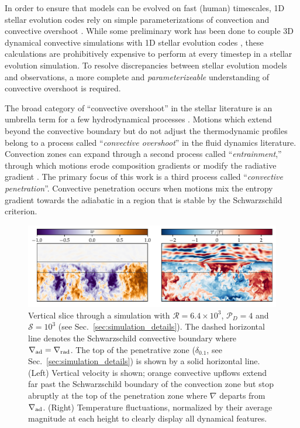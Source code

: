 \documentclass[twocolumn]{aastex631}
\newcommand{\gradrad}{\ensuremath{\nabla_{\rm{rad}}}}
\newcommand{\gradad}{\ensuremath{\nabla_{\rm{ad}}}}
\newcommand{\justgrad}{\ensuremath{\nabla}}
\newcommand{\mP}{\ensuremath{\mathcal{P}}}
\newcommand{\mR}{\ensuremath{\mathcal{R}}}
\newcommand{\mS}{\ensuremath{\mathcal{S}}}
\begin{document}
In order to ensure that models can be evolved on fast (human) timescales, 1D stellar evolution codes rely on simple parameterizations of convection \citep[e.g., mixing length theory,][]{bohm-vitense1958} and convective overshoot \citep{shaviv_salpeter_1973, maeder1975, herwig2000, paxton_etal_2011, paxton_etal_2013, paxton_etal_2018, paxton_etal_2019}.
While some preliminary work has been done to couple 3D dynamical convective simulations with 1D stellar evolution codes \citep{jorgensen_weiss_2019}, these calculations are prohibitively expensive to perform at every timestep in a stellar evolution simulation.
To resolve discrepancies between stellar evolution models and observations, a more complete and \emph{parameterizeable} understanding of convective overshoot is required.

The broad category of ``convective overshoot'' in the stellar literature is an umbrella term for a few hydrodynamical processes \citep{zahn1991, brummell_etal_2002, korre_etal_2019}.
Motions which extend beyond the convective boundary but do not adjust the thermodynamic profiles belong to a process called ``\emph{convective overshoot}'' in the fluid dynamics literature.
Convection zones can expand through a second process called ``\emph{entrainment},'' through which motions erode composition gradients or modify the radiative gradient \citep[][]{meakin_arnett_2007, viallet_etal_2013, cristini_etal_2017, fuentes_cumming_2020, horst_etal_2021}.
The primary focus of this work is a third process called ``\emph{convective penetration}''.
Convective penetration occurs when motions mix the entropy gradient towards the adiabatic in a region that is stable by the Schwarzschild criterion.

\begin{figure}[t]
\centering
\includegraphics[width=\textwidth]{vertical_dynamics_panels.pdf}
\caption{
Vertical slice through a simulation with $\mR = 6.4 \times 10^3$, $\mP_D = 4$ and $\mS = 10^3$ (see Sec.~\ref{sec:simulation_details}).
The dashed horizontal line denotes the Schwarzschild convective boundary where $\gradad = \gradrad$.
The top of the penetrative zone ($\delta_{0.1}$, see Sec.~\ref{sec:simulation_details}) is shown by a solid horizontal line.
(Left) Vertical velocity is shown; orange convective upflows extend far past the Schwarzschild boundary of the convection zone but stop abruptly at the top of the penetration zone where $\justgrad$ departs from $\gradad$.
(Right) Temperature fluctuations, normalized by their average magnitude at each height to clearly display all dynamical features.
\label{fig:vertical_dynamics_panels}
}
\end{figure}
\end{document}
